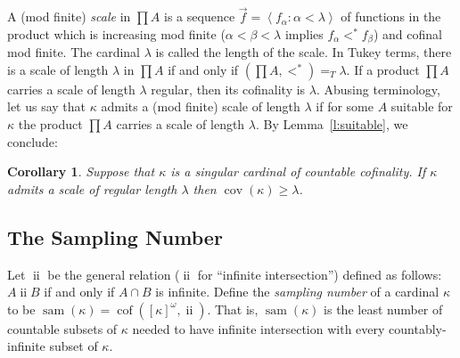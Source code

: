 \documentclass{article}
\newtheorem{cor}[thm]{Corollary}
\newcommand{\la}{\left<}
\newcommand{\ra}{\right>}
\newcommand{\te}{=_T}
\DeclareMathOperator{\ii}{ii}
\DeclareMathOperator{\cof}{cof}
\begin{document}
 A (mod finite) \emph{scale} in $\prod A$ is a sequence $\vec{f}=\la f_\alpha:\alpha<\lambda\ra$ of functions in the product which is increasing mod finite ($\alpha<\beta<\lambda$ implies $f_\alpha<^*f_\beta$) and cofinal mod finite. 
 The cardinal $\lambda$ is called the length of the scale. 
 In Tukey terms, there is a scale of length $\lambda$ in $\prod A$ if and only if $\left(\prod A,<^*\right) \te \lambda$. 
If a product $\prod A$ carries a scale of length $\lambda$ regular, then its cofinality  is $\lambda$. 
 Abusing terminology, let us say that $\kappa$ admits a (mod finite) scale of length $\lambda$ if for some $A$ suitable for $\kappa$ the product $\prod A$ carries a scale of length $\lambda$. 
 By Lemma~\ref{l:suitable}, we conclude:




\begin{cor}\label{cor:ScalesIncreaseSam}
    Suppose that $\kappa$ is a singular cardinal of countable cofinality. If $\kappa$ admits a scale of regular length $\lambda$ then $\mathop{cov}(\kappa)\geq\lambda$. 
\end{cor}

 

\subsection{The Sampling Number}\label{sec:sam}


Let $\ii$ be the general relation ($\ii$ for ``infinite intersection'') defined as follows: $A  \ii   B$ if and only if $A\cap B$ is infinite. Define the \emph{sampling number} of a cardinal $\kappa$ to be $\mathop{sam}(\kappa)=\cof( [\kappa]^{\omega},\ii)$. That is, $\mathop{sam}(\kappa)$ is the least number of countable subsets of $\kappa$ needed to have infinite intersection with every countably-infinite subset of $\kappa$. 
\end{document}
